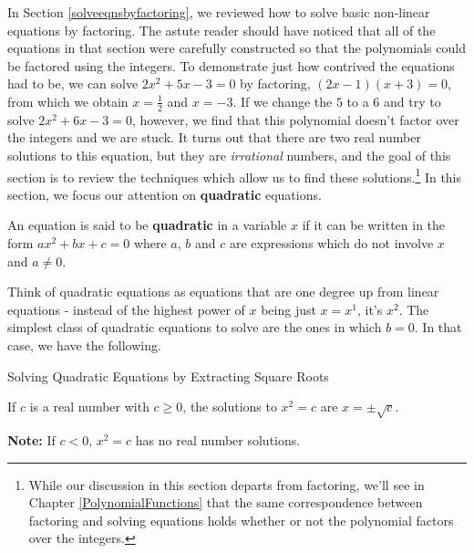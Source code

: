 

\setcounter{footnote}{0}

\label{AppQuadEqus}

In Section \ref{solveeqnsbyfactoring}, we reviewed how to solve basic non-linear equations by factoring.  The astute reader should have noticed that all of the equations in that section were carefully constructed so that the polynomials could be factored using the integers.  To demonstrate just how contrived the equations had to be, we can solve $2x^2+5x-3=0$ by factoring, $(2x-1)(x+3) = 0$, from which we obtain $x = \frac{1}{2}$ and $x = -3$.  If we change the $5$ to a $6$ and try to solve $2x^2 + 6x - 3 = 0$, however, we find that this polynomial doesn't factor over the integers and we are stuck.  It turns out that there are two real number solutions to this equation, but they are \textit{irrational} numbers, and the goal of this section is to review the techniques which allow us to find these solutions.\footnote{While our discussion in this section departs from factoring, we'll see in Chapter \ref{PolynomialFunctions} that the same correspondence between factoring and solving equations holds whether or not the polynomial factors over the integers.}  In this section, we focus our attention on \textbf{quadratic} equations.

\begin{tcolorbox}
    
\begin{defn}\label{quadeqndefn} An equation is said to be \textbf{quadratic} in a variable $x$ if it can be written in the form $ax^2 + bx + c = 0$ where $a$, $b$ and $c$ are expressions which do not involve $x$ and $a \neq 0$.

\end{defn}

\end{tcolorbox}

Think of quadratic equations as equations that are one degree up from linear equations - instead of the highest power of $x$ being just $x = x^1$, it's $x^2$.  The simplest class of quadratic equations to solve are the ones in which $b = 0$.  In that case, we have the following.

\begin{floatbox}[label=box:extractingthesquareroot]{Solving Quadratic Equations by Extracting Square Roots}

\vspace{.05in}
If $c$ is a real number with $c \geq 0$, the solutions to $x^2 = c$ are $x = \pm \sqrt{c}$.

\vspace{.05in}
\textbf{Note:}  If $c < 0$, $x^2 = c$ has no real number solutions.

\end{floatbox}

